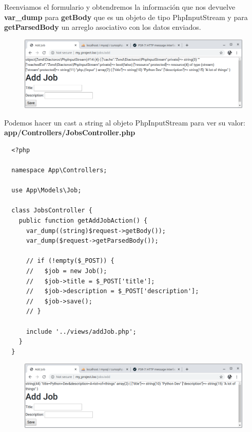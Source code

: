 \documentclass{article}
\begin{document}
Reenviamos el formulario y obtendremos la información que nos devuelve
\textbf{var\_dump} para \textbf{getBody} que es un objeto de tipo
PhpInputStream y para \textbf{getParsedBody} un arreglo asociativo con los
datos enviados.\\

\begin{figure}[h!]
  \centering
  \includegraphics[scale=0.5]{./Pictures/145_vardump.png}
\end{figure}

Podemos hacer un cast a string al objeto PhpInputStream para ver su valor:\\

\textbf{app/Controllers/JobsController.php}
\begin{verbatim}
  <?php

  namespace App\Controllers;

  use App\Models\Job;

  class JobsController {
    public function getAddJobAction() {
      var_dump((string)$request->getBody());
      var_dump($request->getParsedBody());

      // if (!empty($_POST)) {
      //   $job = new Job();
      //   $job->title = $_POST['title'];
      //   $job->description = $_POST['description'];
      //   $job->save();
      // }

      include '../views/addJob.php';
    }
  }
\end{verbatim}

\begin{figure}[h!]
  \centering
  \includegraphics[scale=0.5]{./Pictures/146_vardump_cast.png}
\end{figure}
\end{document}
